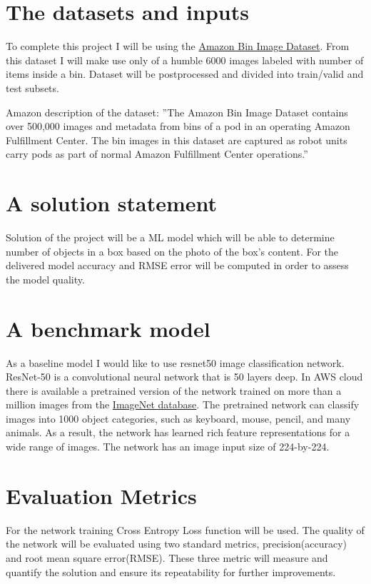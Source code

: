 \documentclass{article}
\begin{document}
\section{The datasets and inputs}
To complete this project I will be using the \href{https://registry.opendata.aws/amazon-bin-imagery/}{Amazon Bin Image Dataset}. From this dataset I will make use only of a humble 6000 images labeled with number of items inside a bin. Dataset will be postprocessed and divided into train/valid and test subsets.

Amazon description of the dataset: ''The Amazon Bin Image Dataset contains over 500,000 images and metadata from bins of a pod in an operating Amazon Fulfillment Center. The bin images in this dataset are captured as robot units carry pods as part of normal Amazon Fulfillment Center operations.''

\section{A solution statement}
Solution of the project will be a ML model which will be able to determine number of objects in a box based on the photo of the box's content. For the delivered model accuracy and RMSE error will be computed in order to assess the model quality. 

\section{A benchmark model}
As a baseline model I would like to use resnet50 image classification network. ResNet-50 is a convolutional neural network that is 50 layers deep. In AWS cloud there is available a pretrained version of the network trained on more than a million images from the \href{http://www.image-net.org}{ImageNet database}. The pretrained network can classify images into 1000 object categories, such as keyboard, mouse, pencil, and many animals. As a result, the network has learned rich feature representations for a wide range of images. The network has an image input size of 224-by-224.

\section{Evaluation Metrics}
For the network training Cross Entropy Loss function will be used. The quality of the network will be evaluated using two standard metrics, precision(accuracy) and root mean square error(RMSE). These three metric will measure and quantify the solution and ensure its repeatability for further improvements.
\end{document}
